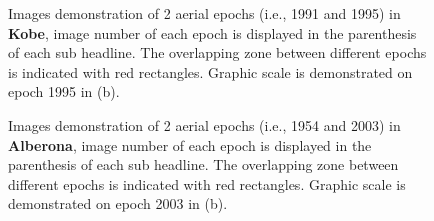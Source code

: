 \begin{figure}[htbp]
\begin{center}
{\begin{minipage}[t]{1\linewidth}
            \end{minipage}%
        }
        \caption{Images demonstration of 2 aerial epochs (i.e., 1991 and 1995) in \textbf{Kobe}, image number of each epoch is displayed in the parenthesis of each sub headline. The overlapping zone between different epochs is indicated with red rectangles. Graphic scale is demonstrated on epoch 1995 in (b).}
        \label{KobeData}
    \end{center}
\end{figure} 

\begin{figure}[htbp]
	\begin{center}
		\caption{Images demonstration of 2 aerial epochs (i.e., 1954 and 2003) in \textbf{Alberona}, image number of each epoch is displayed in the parenthesis of each sub headline. The overlapping zone between different epochs is indicated with red rectangles. Graphic scale is demonstrated on epoch 2003 in (b).}
		\label{AlberonaData}
	\end{center}
\end{figure} 

